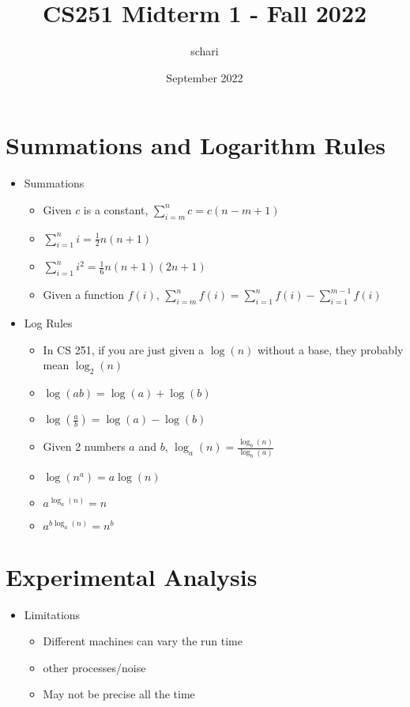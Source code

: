 \documentclass{article}
\title{CS251 Midterm 1 - Fall 2022}
\author{schari}
\date{September 2022}
\begin{document}
\maketitle

\section{Summations and Logarithm Rules}
\begin{itemize}
    \item Summations
        \begin{itemize}
            \item Given $c$ is a constant, $\sum_{i = m}^{n} c = c(n - m + 1)$
            \item $\sum_{i = 1}^{n} i = \frac{1}{2}n(n + 1)$
            \item $\sum_{i = 1}^{n} i^2 = \frac{1}{6}n(n + 1)(2n + 1)$
            \item Given a function $f(i)$, $\sum_{i = m}^{n} f(i) = \sum_{i = 1}^{n} f(i) - \sum_{i = 1}^{m - 1} f(i)$
        \end{itemize}
    \item Log Rules
        \begin{itemize}
            \item In CS 251, if you are just given a $\log(n)$ without a base, they probably mean $\log_2(n)$
            \item $\log(ab) = \log(a) + \log(b)$
            \item $\log(\frac{a}{b}) = \log(a) - \log(b)$
            \item Given 2 numbers $a$ and $b$, $\log_a(n) = \frac{\log_b(n)}{\log_b(a)}$
            \item $\log(n^a) = a \log(n)$
            \item $a^{\log_a(n)} = n$
            \item $a^{b \log_a(n)} = n^b$
        \end{itemize}
\end{itemize}

\section{Experimental Analysis}

\begin{itemize}
    \item Limitations
        \begin{itemize}
            \item Different machines can vary the run time %
            \item other processes/noise
            \item May not be precise all the time 
        \end{itemize}
\end{itemize}
\end{document}
